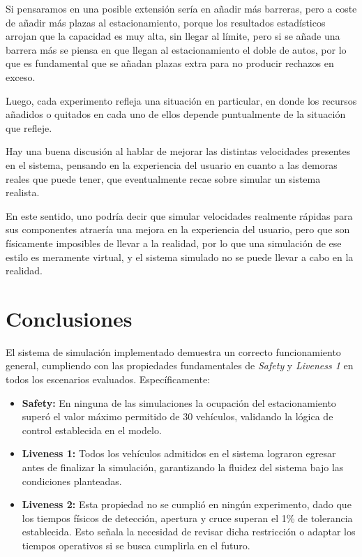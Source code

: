 \documentclass[12pt]{article}
\begin{document}
Si pensaramos en una posible extensión sería en añadir más barreras, pero a coste de añadir más plazas al estacionamiento, porque los resultados estadísticos arrojan que la capacidad es muy alta, sin llegar al límite, pero si se añade una barrera más se piensa en que llegan al estacionamiento el doble de autos, por lo que es fundamental que se añadan plazas extra para no producir rechazos en exceso.

Luego, cada experimento refleja una situación en particular, en donde los recursos añadidos o quitados en cada uno de ellos depende puntualmente de la situación que refleje.

Hay una buena discusión al hablar de mejorar las distintas velocidades presentes en el sistema, pensando en la experiencia del usuario en cuanto a las demoras reales que puede tener, que eventualmente recae sobre simular un sistema realista. 

En este sentido, uno podría decir que simular velocidades realmente rápidas para sus componentes atraería una mejora en la experiencia del usuario, pero que son físicamente imposibles de llevar a la realidad, por lo que una simulación de ese estilo es meramente virtual, y el sistema simulado no se puede llevar a cabo en la realidad.

\section{Conclusiones}

El sistema de simulación implementado demuestra un correcto funcionamiento general, cumpliendo con las propiedades fundamentales de \textit{Safety} y \textit{Liveness 1} en todos los escenarios evaluados. Específicamente:

\begin{itemize}
    \item \textbf{Safety:} En ninguna de las simulaciones la ocupación del estacionamiento superó el valor máximo permitido de 30 vehículos, validando la lógica de control establecida en el modelo.
    
    \item \textbf{Liveness 1:} Todos los vehículos admitidos en el sistema lograron egresar antes de finalizar la simulación, garantizando la fluidez del sistema bajo las condiciones planteadas.

    \item \textbf{Liveness 2:} Esta propiedad no se cumplió en ningún experimento, dado que los tiempos físicos de detección, apertura y cruce superan el 1\% de tolerancia establecida. Esto señala la necesidad de revisar dicha restricción o adaptar los tiempos operativos si se busca cumplirla en el futuro.
\end{itemize}
\end{document}
